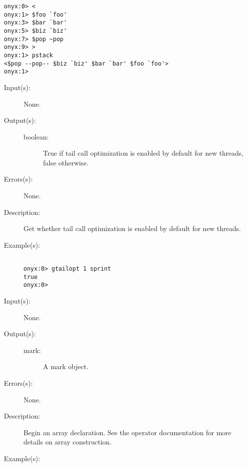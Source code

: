 \begin{description}
\begin{description}
\begin{verbatim}
onyx:0> <
onyx:1> $foo `foo'
onyx:3> $bar `bar'
onyx:5> $biz `biz'
onyx:7> $pop ~pop
onyx:9> >
onyx:1> pstack
<$pop --pop-- $biz `biz' $bar `bar' $foo `foo'>
onyx:1>
		\end{verbatim}
	\end{description}
\label{systemdict:gtailopt}
\item[{\onyxop{--}{gtailopt}{boolean}}: ]
	\begin{description}\item[]
	\item[Input(s): ] None.
	\item[Output(s): ]
		\begin{description}\item[]
		\item[boolean: ]
			True if tail call optimization is enabled by default for
			new threads, false otherwise.
		\end{description}
	\item[Errors(s): ] None.
	\item[Description: ]
		Get whether tail call optimization is enabled by default for new
		threads.
	\item[Example(s): ]\begin{verbatim}

onyx:0> gtailopt 1 sprint
true
onyx:0>
		\end{verbatim}
	\end{description}
\label{systemdict:sym_lb}
\index{[@\onyxop{}{{\lb}}{}}
\item[{\onyxop{--}{{\lb}}{mark}}: ]
	\begin{description}\item[]
	\item[Input(s): ] None.
	\item[Output(s): ]
		\begin{description}\item[]
		\item[mark: ]
			A mark object.
		\end{description}
	\item[Errors(s): ] None.
	\item[Description: ]
		Begin an array declaration.  See the
		\htmlref{\onyxop{}{]}{}}{systemdict:sym_rb} operator
		documentation for more details on array construction.
	\item[Example(s): ]\begin{verbatim}


\end{verbatim}
\end{description}
\end{description}
